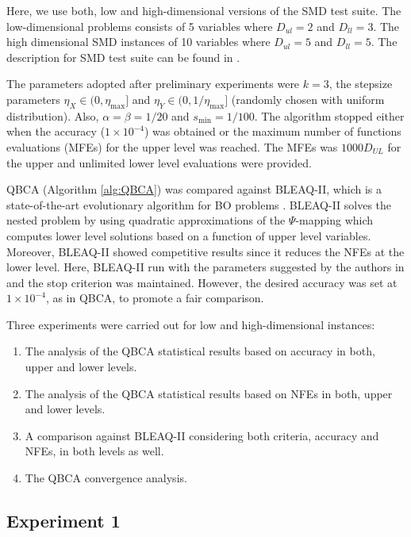 \documentclass[conference]{IEEEtran}
\theoremstyle{definition}
\begin{document}
Here, we use both, low and high-dimensional versions of the SMD test suite. The low-dimensional problems consists of 5 variables where $D_{ul} = 2$ and $D_{ll}  = 3$. The high dimensional SMD instances of 10 variables where $D_{ul} = 5$ and $D_{ll}  = 5$. The description for SMD test suite can be found in \cite{sinha2014test}.


The parameters adopted after preliminary
experiments were $k = 3$, the stepsize parameters $\eta_{X} \in (0, \eta_{\max}]$ and $\eta_{Y} \in (0, 1/\eta_{\max}]$ (randomly chosen with uniform distribution). Also,
$\alpha = \beta = 1 / 20$ and $s_{\min} = 1/100$. 
The  algorithm stopped either
when the accuracy ($1\times 10^{-4}$) was obtained or the maximum number of functions evaluations (MFEs) for the upper level was reached.
% 
% 
The MFEs was $1000D_{UL}$ for the upper and unlimited lower level evaluations were provided.
% 


% 
QBCA (Algorithm \ref{alg:QBCA}) was compared against BLEAQ-II, which is a state-of-the-art
evolutionary algorithm for BO problems \cite{sinha2018review,sinha2013efficient}.
BLEAQ-II solves the nested problem by using quadratic approximations of the
$\Psi$-mapping which computes lower level solutions based on a function of upper
level variables. Moreover, BLEAQ-II showed competitive results since it reduces
the NFEs at the lower level. Here, BLEAQ-II run with the parameters suggested by
the authors in \cite{sinha2018review,sinha2017bilevel} and the stop criterion was
maintained.  However, the desired accuracy was set at $1\times 10^{-4}$, as in
QBCA, to promote a fair comparison.

Three experiments were carried out for low and high-dimensional instances:
% 
\begin{enumerate}
    \item The analysis of the QBCA statistical results based on accuracy in both,
          upper and lower levels.
    \item The analysis of the QBCA statistical results based on NFEs in both,
          upper and lower levels. 
    \item A comparison against BLEAQ-II considering both criteria, accuracy and
          NFEs, in both levels as well.
    \item  The QBCA convergence analysis.
\end{enumerate}
% 


\subsection{Experiment 1}
\end{document}
